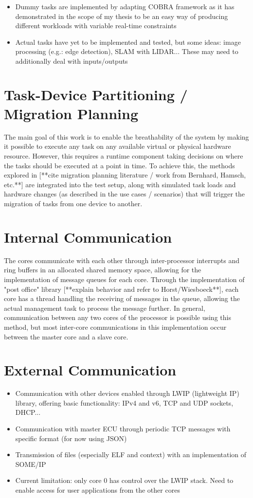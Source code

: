 \begin{itemize}
	\item Dummy tasks are implemented by adapting COBRA framework as it has demonstrated in the scope of my thesis to be an easy way of producing different workloads with variable real-time constraints
	\item Actual tasks have yet to be implemented and tested, but some ideas: image processing (e.g.: edge detection), SLAM with LIDAR... These may need to additionally deal with inputs/outputs
\end{itemize}

\section{Task-Device Partitioning / Migration Planning}
The main goal of this work is to enable the breathability of the system by making it possible to execute any task on any available virtual or physical hardware resource. However, this requires a runtime component taking decisions on where the tasks should be executed at a point in time. To achieve this, the methods explored in [**cite migration planning literature / work from Bernhard, Hamsch, etc.**] are integrated into the test setup, along with simulated task loads and hardware changes (as described in the use cases / scenarios) that will trigger the migration of tasks from one device to another. 

\section{Internal Communication}
The cores communicate with each other through inter-processor interrupts and ring buffers in an allocated shared memory space, allowing for the implementation of message queues for each core. Through the implementation of "post office" library [**explain behavior and refer to Horst/Wiesboeck**], each core has a thread handling the receiving of messages in the queue, allowing the actual management task to process the message further. In general, communication between any two cores of the processor is possible using this method, but most inter-core communications in this implementation occur between the master core and a slave core.

\section{External Communication}
\begin{itemize}
	\item Communication with other devices enabled through LWIP (lightweight IP) library, offering basic functionality: IPv4 and v6, TCP and UDP sockets, DHCP...
	\item Communication with master ECU through periodic TCP messages with specific format (for now using JSON)
	\item Transmission of files (especially ELF and context) with an implementation of SOME/IP
	\item Current limitation: only core 0 has control over the LWIP stack. Need to enable access for user applications from the other cores
\end{itemize}

